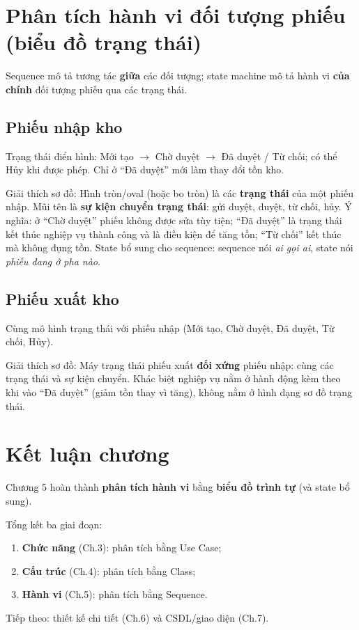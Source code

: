 \section{Phân tích hành vi đối tượng phiếu (biểu đồ trạng thái)}

Sequence mô tả tương tác \textbf{giữa} các đối tượng; state machine mô tả hành vi \textbf{của chính} đối tượng phiếu qua các trạng thái.

\subsection{Phiếu nhập kho}

Trạng thái điển hình: Mới tạo $\rightarrow$ Chờ duyệt $\rightarrow$ Đã duyệt / Từ chối; có thể Hủy khi được phép. Chỉ ở ``Đã duyệt'' mới làm thay đổi tồn kho.



Giải thích sơ đồ: Hình tròn/oval (hoặc bo tròn) là các \textbf{trạng thái} của một phiếu nhập. Mũi tên là \textbf{sự kiện chuyển trạng thái}: gửi duyệt, duyệt, từ chối, hủy. Ý nghĩa: ở ``Chờ duyệt'' phiếu không được sửa tùy tiện; ``Đã duyệt'' là trạng thái kết thúc nghiệp vụ thành công và là điều kiện để tăng tồn; ``Từ chối'' kết thúc mà không đụng tồn. State bổ sung cho sequence: sequence nói \textit{ai gọi ai}, state nói \textit{phiếu đang ở pha nào}.

\subsection{Phiếu xuất kho}

Cùng mô hình trạng thái với phiếu nhập (Mới tạo, Chờ duyệt, Đã duyệt, Từ chối, Hủy).



Giải thích sơ đồ: Máy trạng thái phiếu xuất \textbf{đối xứng} phiếu nhập: cùng các trạng thái và sự kiện chuyển. Khác biệt nghiệp vụ nằm ở hành động kèm theo khi vào ``Đã duyệt'' (giảm tồn thay vì tăng), không nằm ở hình dạng sơ đồ trạng thái.

\section{Kết luận chương}

Chương 5 hoàn thành \textbf{phân tích hành vi} bằng \textbf{biểu đồ trình tự} (và state bổ sung).

Tổng kết ba giai đoạn:
\begin{enumerate}[leftmargin=1.5cm]
    \item \textbf{Chức năng} (Ch.3): phân tích bằng Use Case;
    \item \textbf{Cấu trúc} (Ch.4): phân tích bằng Class;
    \item \textbf{Hành vi} (Ch.5): phân tích bằng Sequence.
\end{enumerate}

Tiếp theo: thiết kế chi tiết (Ch.6) và CSDL/giao diện (Ch.7).
